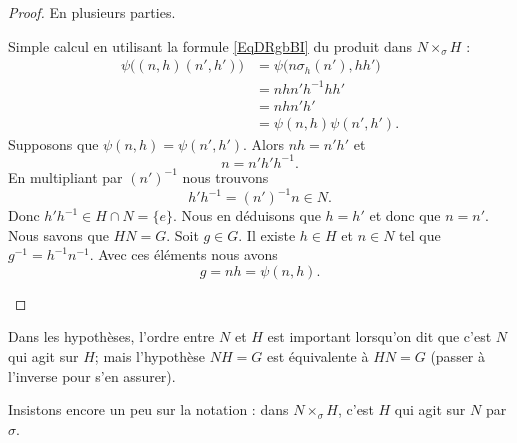 \begin{proof}
	En plusieurs parties.
	\begin{subproof}
		Simple calcul en utilisant la formule \eqref{EqDRgbBI} du produit dans \( N\times_{\sigma}H\) :
		\begin{subequations}
			\begin{align}
				\psi\big( (n,h)(n',h') \big) & =\psi\big( n\sigma_h(n'),hh' \big) \\
				                             & =nhn'h^{-1}hh'                     \\
				                             & =nhn'h'                            \\
				                             & =\psi(n,h)\psi(n',h').
			\end{align}
		\end{subequations}
		Supposons que \( \psi(n,h)=\psi(n',h')\). Alors \( nh=n'h'\) et
		\begin{equation}
			n=n'h'h^{-1}.
		\end{equation}
		En multipliant par \( (n')^{-1}\) nous trouvons
		\begin{equation}
			h'h^{-1}=(n')^{-1}n\in N.
		\end{equation}
		Donc \( h'h^{-1}\in H\cap N=\{ e \}\). Nous en déduisons que \( h=h'\) et donc que \( n=n'\).
		Nous savons que \( HN=G\). Soit \( g\in G\). Il existe \( h\in H\) et \( n\in N\) tel que \( g^{-1}=h^{-1}n^{-1}\). Avec ces éléments nous avons
		\begin{equation}
			g=nh=\psi(n,h).
		\end{equation}
	\end{subproof}
\end{proof}

Dans les hypothèses, l'ordre entre \( N\) et \( H\) est important lorsqu'on dit que c'est \( N\) qui agit sur \( H\); mais l'hypothèse \( NH=G\) est équivalente à \( HN=G\) (passer à l'inverse pour s'en assurer).

Insistons encore un peu sur la notation : dans \( N\times_{\sigma}H\), c'est \( H\) qui agit sur \( N\) par \( \sigma\).

